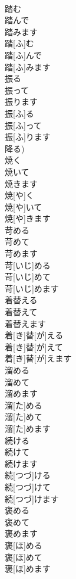 \documentclass[8pt]{extreport}
\begin{document}
\begin{CJK}{UTF8}{min}
\\	踏む 
\\	踏んで 
\\	踏みます	
\\	踏[ふ]む 
\\	踏[ふ]んで 
\\	踏[ふ]みます	
\\	振る 
\\	振って 
\\	振ります	
\\	振[ふ]る 
\\	振[ふ]って 
\\	振[ふ]ります 
\\	降る)	
\\	焼く 
\\	焼いて 
\\	焼きます	
\\	焼[や]く 
\\	焼[や]いて 
\\	焼[や]きます	
\\	苛める 
\\	苛めて 
\\	苛めます	
\\	苛[いじ]める 
\\	苛[いじ]めて 
\\	苛[いじ]めます	
\\	着替える 
\\	着替えて 
\\	着替えます	
\\	着[き]替[が]える 
\\	着[き]替[が]えて 
\\	着[き]替[が]えます	
\\	溜める 
\\	溜めて 
\\	溜めます	
\\	溜[た]める 
\\	溜[た]めて 
\\	溜[た]めます	
\\	続ける 
\\	続けて 
\\	続けます	
\\	続[つづ]ける 
\\	続[つづ]けて 
\\	続[つづ]けます	
\\	褒める 
\\	褒めて 
\\	褒めます	
\\	褒[ほ]める 
\\	褒[ほ]めて 
\\	褒[ほ]めます	

\end{CJK}
\end{document}

